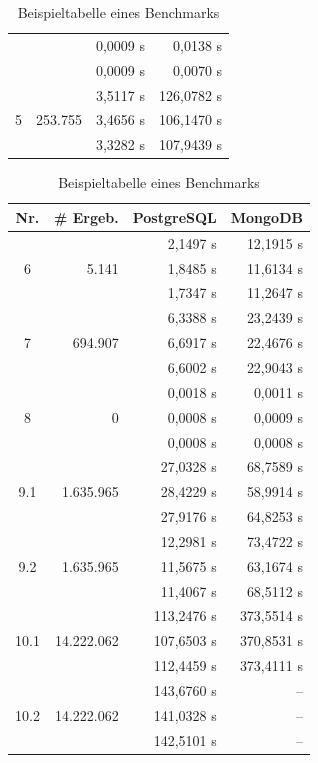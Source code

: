 \begin{table}[hb]
\begin{minipage}{0.49\linewidth}
\begin{tabular}{||c | r | r | r |}
    & & 0,0009 s & 0,0138 s \\
    & & 0,0009 s & 0,0070 s \\
    \hline
    \multirow{3}{*}{5} & \multirow{3}{*}{253.755}
      & 3,5117 s & 126,0782 s \\
    & & 3,4656 s & 106,1470 s \\
    & & 3,3282 s & 107,9439 s \\
    \hline
\end{tabular}
\end{minipage}
%
\begin{minipage}{0.49\linewidth}
\centering
\begin{tabular}{|c | r | r | r ||} 
    \hline
    \textbf{Nr.} & \textbf{\# Ergeb.} & \textbf{PostgreSQL} & \textbf{MongoDB} \\ [0.5ex] 
    \hline\hline 
    \multirow{3}{*}{6} & \multirow{3}{*}{5.141}
      & 2,1497 s & 12,1915 s \\
    & & 1,8485 s & 11,6134 s \\
    & & 1,7347 s & 11,2647 s \\
    \hline
    \multirow{3}{*}{7} & \multirow{3}{*}{694.907} 
      & 6,3388 s & 23,2439 s \\
    & & 6,6917 s & 22,4676 s \\
    & & 6,6002 s & 22,9043 s \\
    \hline
    \multirow{3}{*}{8} & \multirow{3}{*}{0} 
      & 0,0018 s & 0,0011 s \\
    & & 0,0008 s & 0,0009 s \\
    & & 0,0008 s & 0,0008 s \\
    \hline
    \multirow{3}{*}{9.1} & \multirow{3}{*}{1.635.965} 
      & 27,0328 s & 68,7589 s \\
    & & 28,4229 s & 58,9914 s \\
    & & 27,9176 s & 64,8253 s \\
    \hline
    \multirow{3}{*}{9.2} & \multirow{3}{*}{1.635.965} 
      & 12,2981 s & 73,4722 s \\
    & & 11,5675 s & 63,1674 s \\
    & & 11,4067 s & 68,5112 s \\
    \hline
    \multirow{3}{*}{10.1} & \multirow{3}{*}{14.222.062} 
      & 113,2476 s & 373,5514 s \\
    & & 107,6503 s & 370,8531 s \\
    & & 112,4459 s & 373,4111 s \\
    \hline
    \multirow{3}{*}{10.2} & \multirow{3}{*}{14.222.062} 
      & 143,6760 s & -- \\
    & & 141,0328 s & -- \\
    & & 142,5101 s & -- \\
    \hline
\end{tabular}
\end{minipage}
\caption{Beispieltabelle eines Benchmarks}
\label{tab:benchmark_results}
\end{table}
